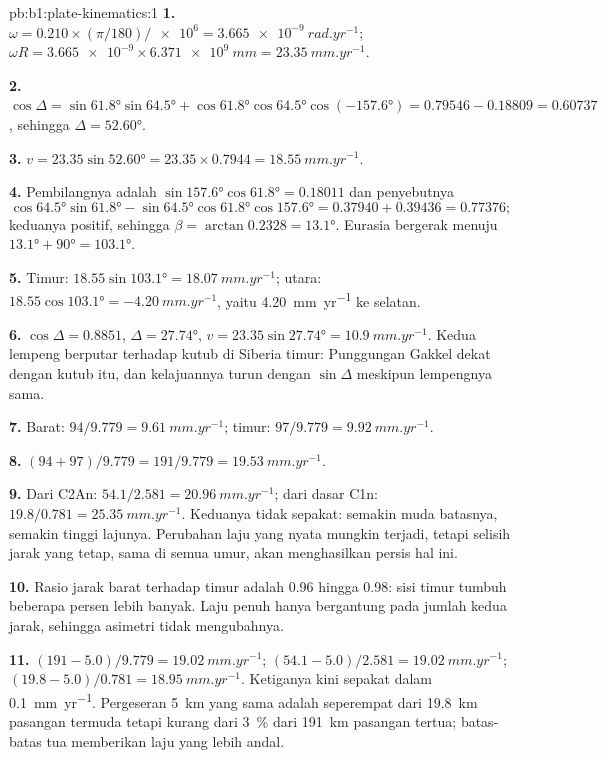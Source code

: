 \begin{solution}{pb:b1:plate-kinematics:1}
\textbf{1.} $\omega = 0.210\times(\pi/180)/\num{e6} = \qty{3.665e-9}{rad.yr^{-1}}$;
$\omega R = \num{3.665e-9}\times\qty{6.371e9}{mm} = \qty{23.35}{mm.yr^{-1}}$.

\textbf{2.} $\cos\Delta = \sin\ang{61.8}\sin\ang{64.5} + \cos\ang{61.8}
\cos\ang{64.5}\cos(\ang{-157.6}) = 0.79546 - 0.18809 = 0.60737$, sehingga
$\Delta = \ang{52.60}$.

\textbf{3.} $v = 23.35\sin\ang{52.60} = 23.35\times0.7944 =
\qty{18.55}{mm.yr^{-1}}$.

\textbf{4.} Pembilangnya adalah $\sin\ang{157.6}\cos\ang{61.8} = 0.18011$ dan
penyebutnya
\[
  \cos\ang{64.5}\sin\ang{61.8} - \sin\ang{64.5}\cos\ang{61.8}\cos\ang{157.6} =
  0.37940 + 0.39436 = 0.77376;
\]
keduanya positif, sehingga $\beta = \arctan 0.2328 =
\ang{13.1}$. Eurasia bergerak menuju $\ang{13.1} + \ang{90} = \ang{103.1}$.

\textbf{5.} Timur: $18.55\sin\ang{103.1} = \qty{18.07}{mm.yr^{-1}}$; utara:
$18.55\cos\ang{103.1} = \qty{-4.20}{mm.yr^{-1}}$, yaitu \qty{4.20}{mm.yr^{-1}}
ke selatan.

\textbf{6.} $\cos\Delta = 0.8851$, $\Delta = \ang{27.74}$, $v = 23.35
\sin\ang{27.74} = \qty{10.9}{mm.yr^{-1}}$. Kedua lempeng berputar terhadap kutub di
Siberia timur: Punggungan Gakkel dekat dengan kutub itu, dan kelajuannya turun dengan
$\sin\Delta$ meskipun lempengnya sama.

\textbf{7.} Barat: $94/9.779 = \qty{9.61}{mm.yr^{-1}}$; timur: $97/9.779 =
\qty{9.92}{mm.yr^{-1}}$.

\textbf{8.} $(94 + 97)/9.779 = 191/9.779 = \qty{19.53}{mm.yr^{-1}}$.

\textbf{9.} Dari C2An: $54.1/2.581 = \qty{20.96}{mm.yr^{-1}}$; dari dasar
C1n: $19.8/0.781 = \qty{25.35}{mm.yr^{-1}}$. Keduanya tidak sepakat: semakin muda batasnya, semakin tinggi lajunya. Perubahan laju yang nyata mungkin terjadi, tetapi selisih jarak yang tetap, sama di semua umur, akan menghasilkan persis hal ini.

\textbf{10.} Rasio jarak barat terhadap timur adalah 0.96 hingga 0.98: sisi timur tumbuh beberapa persen lebih banyak. Laju penuh hanya bergantung pada
jumlah kedua jarak, sehingga asimetri tidak mengubahnya.

\textbf{11.} $(191 - 5.0)/9.779 = \qty{19.02}{mm.yr^{-1}}$;
$(54.1 - 5.0)/2.581 = \qty{19.02}{mm.yr^{-1}}$; $(19.8 - 5.0)/0.781 =
\qty{18.95}{mm.yr^{-1}}$. Ketiganya kini sepakat dalam
\qty{0.1}{mm.yr^{-1}}. Pergeseran \qty{5}{km} yang sama adalah seperempat dari \qty{19.8}{km}
pasangan termuda tetapi kurang dari \qty{3}{\percent} dari \qty{191}{km} pasangan
tertua; batas-batas tua memberikan laju yang lebih andal.


\end{solution}
